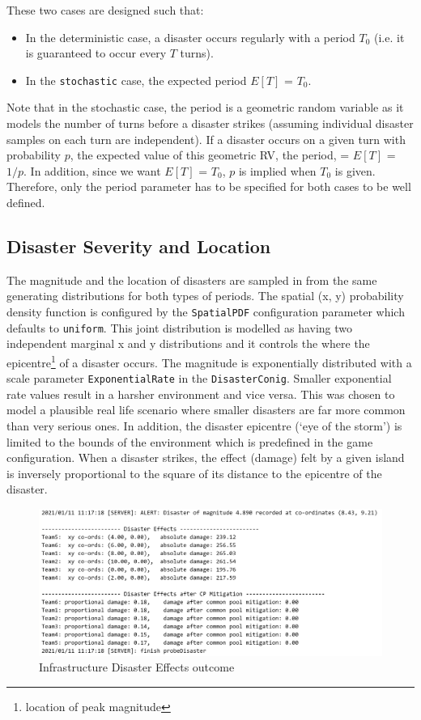These two cases are designed such that:
\begin{itemize}
    \item In the deterministic case, a disaster occurs regularly with a period $T_{0}$ (i.e. it is guaranteed to occur every $T$ turns).
    \item In the \texttt{stochastic} case, the expected period $E[T]$ = $T_0$.
\end{itemize}

Note that in the stochastic case, the period is a geometric random variable as it models the number of turns before a disaster strikes (assuming individual disaster samples on each turn are independent). If a disaster occurs on a given turn with probability $p$, the expected value of this geometric RV, the period, = $E[T]$ = $1/p$. In addition, since we want
$E[T]$ = $T_{0}$, $p$ is implied when $T_{0}$ is given. Therefore, only the period parameter has to be specified for both cases to be well defined.

\subsection {Disaster Severity and Location}

The magnitude and the location of disasters are sampled in from the same generating distributions for both types of periods.
The spatial (x, y) probability density function is configured by the \texttt{SpatialPDF} configuration parameter which defaults to \texttt{uniform}. This joint distribution is modelled as having two independent marginal x and y distributions and it controls the where the epicentre\footnote{location of peak magnitude} of a disaster occurs. The magnitude is exponentially distributed with a scale parameter \texttt{ExponentialRate} in the \texttt{DisasterConig}. Smaller exponential rate values result in a harsher environment and vice versa. This was chosen to model a plausible real life scenario where smaller disasters are far more common than very serious ones.
In addition, the disaster epicentre (`eye of the storm') is limited to the bounds of the environment which is predefined in the game configuration. When a disaster strikes, the effect (damage) felt by a given island is inversely proportional to the square of its distance to the epicentre of the disaster.

\begin{figure}[!htb]
    \centering
    \includegraphics[width=1\textwidth]{04_environment/images/Disaster Effects Outcome.PNG}
    \caption{Infrastructure Disaster Effects outcome}
    \label{fig:Disaster Effects Outcome}
\end{figure}

